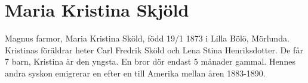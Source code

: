 \chapter{Maria Kristina Skjöld}
\label{maria_kristina_skjöld}
Magnus farmor, Maria Kristina Sköld, född 19/1 1873 i Lilla Bölö, Mörlunda. Kristinas föräldrar heter Carl Fredrik Sköld och Lena Stina Henriksdotter. De får 7 barn, Kristina är den yngsta. En bror dör endast 5 månader gammal. Hennes andra syskon emigrerar en efter en  till Amerika mellan åren 1883-1890.